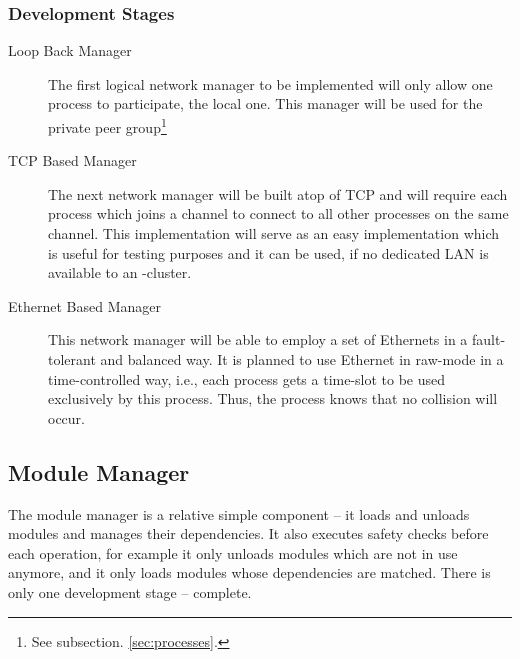 \documentclass[a4paper, 10pt]{book}
\begin{document}
                                \subsubsection{Development Stages}

                                \begin{description}
                                    \item[Loop Back Manager] The first logical network manager to be
                                        implemented will only allow one process to participate, the local
                                        one. This manager will be used for the private peer
                                        group\footnote{See subsection. \vref{sec:processes}.}
                                    \item[TCP Based Manager] The next network manager will be built atop
                                        of TCP and will require each process which joins a channel to
                                        connect to all other processes on the same channel. This
                                        implementation will serve as an easy implementation which is useful
                                        for testing purposes and it can be used, if no dedicated LAN is
                                        available to an \SYNEIGHT-cluster. 
                                    \item[Ethernet Based Manager] This network manager will be able to
                                        employ a set of Ethernets in a fault-tolerant and balanced way. It
                                        is planned to use Ethernet in raw-mode in a time-controlled way,
                                        i.e., each process gets a time-slot to be used exclusively by this
                                        process. Thus, the process knows that no collision will occur. 
                                \end{description}


                                \subsection{Module Manager}
                                \label{sec:module-manager}

                                The module manager is a relative simple component -- it loads and
                                unloads modules and manages their dependencies. It also executes
                                safety checks before each operation, for example it only unloads
                                modules which are not in use anymore, and it only loads modules whose
                                dependencies are matched. There is only one development stage --
                                complete. 
\end{document}
